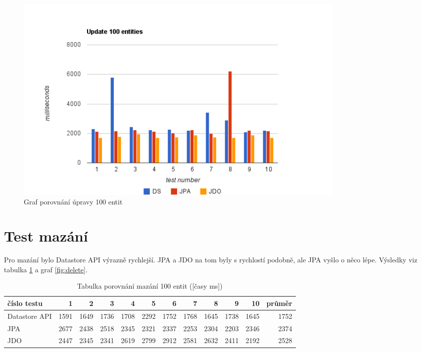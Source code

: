 \begin{figure}[h]
\begin{center}
\includegraphics[width=6.5in]{figures/update.png}
\caption{Graf porovnání úpravy 100 entit}
\label{fig:update}
\end{center}
\end{figure}


\section{Test mazání}

Pro mazání bylo Datastore API výrazně rychlejší. JPA a JDO na tom byly s rychlostí podobně, ale JPA vyšlo o něco lépe. Výsledky viz tabulka \ref{tab:delete} a graf \ref{fig:delete}.

\begin{table}[h]
\centering
\caption{Tabulka porovnání mazání 100 entit ([časy ms])}\label{tab:delete}
\begin{tabular}{|l|r|r|r|r|r|r|r|r|r|r|r|}
   \hline
číslo testu	& 1		& 2		& 3		& 4		& 5		& 6		& 7		& 8		& 9		& 10		& průměr \\
   \hline
Datastore API	& 1591	& 1649	& 1736	& 1708	& 2292	& 1752	& 1768	& 1645	& 1738	& 1645	& 1752 \\
JPA	& 2677	& 2438	& 2518	& 2345	& 2321	& 2337	& 2253	& 2304	& 2203	& 2346	& 2374 \\
JDO	& 2447	& 2345	& 2341	& 2619	& 2799	& 2912	& 2581	& 2632	& 2411	& 2192	& 2528 \\
   \hline
\end{tabular}
\end{table}

